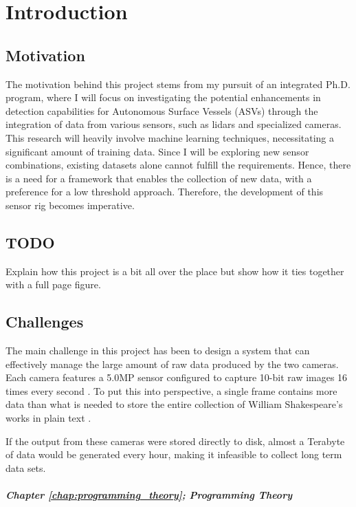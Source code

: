 \chapter{Introduction}

\section{Motivation}

The motivation behind this project stems from my pursuit of an integrated Ph.D.
program, where I will focus on investigating the potential enhancements in detection capabilities for Autonomous Surface Vessels (ASVs) through the integration of data from various sensors, such as lidars and specialized cameras.
This research will heavily involve machine learning techniques, necessitating a significant amount of training data.
Since I will be exploring new sensor combinations, existing datasets alone cannot fulfill the requirements.
Hence, there is a need for a framework that enables the collection of new data, with a preference for a low threshold approach.
Therefore, the development of this sensor rig becomes imperative.


\section{TODO}
Explain how this project is a bit all over the place but show how it ties together with a full page figure.

\section{Challenges}
The main challenge in this project has been to design a system that can effectively manage the large amount of raw data produced by the two cameras.
Each camera features a 5.0MP sensor configured to capture 10-bit raw images 16 times every second \cite{lucidvisionlabsTriton0MPPolarization}.
To put this into perspective, a single frame contains more data than what is needed to store the entire collection of William Shakespeare's works in plain text \cite{projectgutenbergCompleteWorksWilliam1994}.

If the output from these cameras were stored directly to disk, almost a Terabyte of data would be generated every hour, making it infeasible to collect long term data sets.

\paragraph{Chapter \ref{chap:programming_theory}; Programming Theory}
